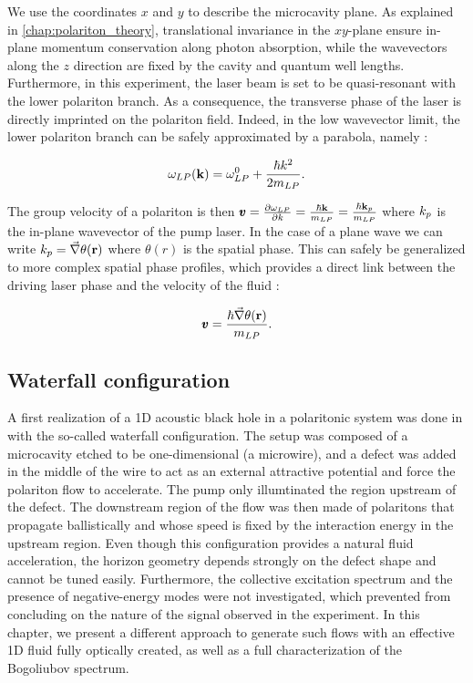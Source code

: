 We use the coordinates $x$ and $y$ to describe the microcavity plane. As explained in \autoref{chap:polariton_theory}, translational invariance in the $xy$-plane ensure in-plane momentum conservation along photon absorption, while the wavevectors along the
$z$ direction are fixed by the cavity and quantum well lengths. Furthermore, in this experiment, the laser beam is set to be quasi-resonant with the lower polariton branch. As a consequence, the transverse phase of the laser is directly imprinted on the polariton field.
Indeed, in the low wavevector limit, the lower polariton branch can be safely approximated by a parabola, namely :

\begin{equation}
    \omega_{LP}(\mathbf{k}) = \omega_{LP}^0 + \dfrac{\hbar k^2}{2m_{LP}}.
\end{equation}

The group velocity of a polariton is then $\pmb{v} = \frac{\partial \omega_{LP}}{\partial k} = \frac{\hbar \mathbf{k}}{m_{LP}}= \frac{\hbar \mathbf{k}_p}{m_{LP}}$ where $k_p$ is the in-plane wavevector of the pump laser.
In the case of a plane wave we can write $k_p=\vec{\nabla}\theta(\mathbf{r})$ where $\theta(r)$ is the spatial phase. This can safely be generalized to more complex spatial phase profiles,
which provides a direct link between the driving laser phase and the velocity of the fluid :

\begin{equation}
    \pmb{v} = \dfrac{\hbar \vec{\nabla} \theta(\mathbf{r})}{m_{LP}} .
\end{equation}

\subsection{Waterfall configuration}
A first realization of a 1D acoustic black hole in a polaritonic system was done in \cite{nguyen_acoustic_2015} with the so-called waterfall configuration. 
The setup was composed of a microcavity etched to be one-dimensional (a microwire), and a defect was added in the middle of the wire to act as an external attractive potential and force the polariton flow to accelerate. The pump only illumtinated the region upstream of the defect. The downstream region of the flow was then made of polaritons that propagate ballistically and whose speed is fixed by the interaction energy
in the upstream region.
Even though this configuration provides a natural fluid acceleration, the horizon geometry depends strongly on the defect shape and cannot be tuned easily.  Furthermore, the collective excitation spectrum and the presence of negative-energy modes were not investigated, which 
prevented from concluding on the nature of the signal observed in the experiment. In this chapter, we present a different approach to generate such flows with an effective 1D fluid fully optically created, as well as a full characterization of the Bogoliubov spectrum.

